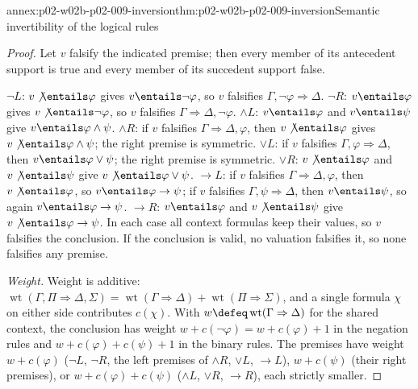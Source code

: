 \begin{annexitem}{annex:p02-w02b-p02-009-inversion}{thm:p02-w02b-p02-009-inversion}{Semantic invertibility of the logical rules}
\begin{proof}
Let \(v\) falsify the indicated premise; then every member of its antecedent
support is true and every member of its succedent support false.

\(\neg L\): \(v\not\entails\varphi\) gives \(v\entails\neg\varphi\), so \(v\)
falsifies \(\Gamma,\neg\varphi\Rightarrow\Delta\).
\(\neg R\): \(v\entails\varphi\) gives \(v\not\entails\neg\varphi\), so \(v\)
falsifies \(\Gamma\Rightarrow\Delta,\neg\varphi\).
\(\land L\): \(v\entails\varphi\) and \(v\entails\psi\) give
\(v\entails\varphi\land\psi\).
\(\land R\): if \(v\) falsifies \(\Gamma\Rightarrow\Delta,\varphi\), then
\(v\not\entails\varphi\) gives \(v\not\entails\varphi\land\psi\); the right
premise is symmetric.
\(\lor L\): if \(v\) falsifies \(\Gamma,\varphi\Rightarrow\Delta\), then
\(v\entails\varphi\lor\psi\); the right premise is symmetric.
\(\lor R\): \(v\not\entails\varphi\) and \(v\not\entails\psi\) give
\(v\not\entails\varphi\lor\psi\).
\(\to L\): if \(v\) falsifies \(\Gamma\Rightarrow\Delta,\varphi\), then
\(v\not\entails\varphi\), so \(v\entails\varphi\to\psi\); if \(v\) falsifies
\(\Gamma,\psi\Rightarrow\Delta\), then \(v\entails\psi\), so again
\(v\entails\varphi\to\psi\).
\(\to R\): \(v\entails\varphi\) and \(v\not\entails\psi\) give
\(v\not\entails\varphi\to\psi\).
In each case all context formulas keep their values, so \(v\) falsifies the
conclusion.  If the conclusion is valid, no valuation falsifies it, so none
falsifies any premise.

\emph{Weight.}  Weight is additive:
\(\operatorname{wt}(\Gamma,\Pi\Rightarrow\Delta,\Sigma)=
\operatorname{wt}(\Gamma\Rightarrow\Delta)+\operatorname{wt}(\Pi\Rightarrow\Sigma)\),
and a single formula \(\chi\) on either side contributes \(c(\chi)\).  With
\(w\defeq\operatorname{wt}(\Gamma\Rightarrow\Delta)\) for the shared context,
the conclusion has weight \(w+c(\neg\varphi)=w+c(\varphi)+1\) in the
negation rules and \(w+c(\varphi)+c(\psi)+1\) in the binary rules.  The
premises have weight \(w+c(\varphi)\) (\(\neg L\), \(\neg R\), the left
premises of \(\land R\), \(\lor L\), \(\to L\)), \(w+c(\psi)\) (their right
premises), or \(w+c(\varphi)+c(\psi)\) (\(\land L\), \(\lor R\), \(\to R\)),
each strictly smaller.
\end{proof}
\end{annexitem}

